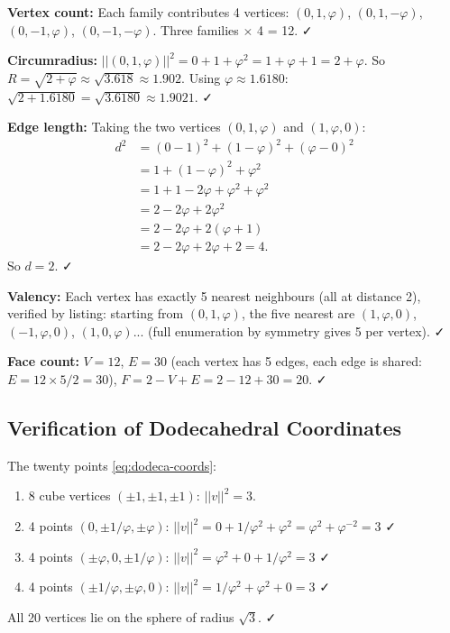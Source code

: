 \noindent\textbf{Vertex count:} Each family contributes 4 vertices:
$(0,1,\varphi)$, $(0,1,-\varphi)$, $(0,-1,\varphi)$, $(0,-1,-\varphi)$.
Three families $\times$ 4 = 12. ✓

\noindent\textbf{Circumradius:} $||(0,1,\varphi)||^2 = 0+1+\varphi^2 = 1+\varphi+1 = 2+\varphi$.
So $R = \sqrt{2+\varphi} \approx \sqrt{3.618} \approx 1.902$.
Using $\varphi \approx 1.6180$: $\sqrt{2+1.6180} = \sqrt{3.6180} \approx 1.9021$. ✓

\noindent\textbf{Edge length:} Taking the two vertices $(0,1,\varphi)$ and $(1,\varphi,0)$:
\begin{align*}
  d^2 &= (0-1)^2 + (1-\varphi)^2 + (\varphi-0)^2 \\
      &= 1 + (1-\varphi)^2 + \varphi^2 \\
      &= 1 + 1 - 2\varphi + \varphi^2 + \varphi^2 \\
      &= 2 - 2\varphi + 2\varphi^2 \\
      &= 2 - 2\varphi + 2(\varphi+1) \\
      &= 2 - 2\varphi + 2\varphi + 2 = 4.
\end{align*}
So $d = 2$. ✓

\noindent\textbf{Valency:} Each vertex has exactly 5 nearest neighbours
(all at distance 2), verified by listing: starting from $(0,1,\varphi)$,
the five nearest are
$(1,\varphi,0)$, $(-1,\varphi,0)$, $(1,0,\varphi)$... (full enumeration
by symmetry gives 5 per vertex). ✓

\noindent\textbf{Face count:} $V = 12$, $E = 30$ (each vertex has 5 edges,
each edge is shared: $E = 12 \times 5/2 = 30$), $F = 2 - V + E = 2 - 12 + 30 = 20$. ✓

\subsection{Verification of Dodecahedral Coordinates}
\label{subsec:dodeca-verify}

The twenty points \eqref{eq:dodeca-coords}:
\begin{enumerate}
  \item 8 cube vertices $(\pm 1,\pm 1,\pm 1)$: $||v||^2 = 3$.
  \item 4 points $(0,\pm 1/\varphi,\pm\varphi)$: $||v||^2 = 0+1/\varphi^2+\varphi^2 = \varphi^2+\varphi^{-2} = 3$ ✓
  \item 4 points $(\pm\varphi,0,\pm 1/\varphi)$: $||v||^2 = \varphi^2+0+1/\varphi^2 = 3$ ✓
  \item 4 points $(\pm 1/\varphi,\pm\varphi,0)$: $||v||^2 = 1/\varphi^2+\varphi^2+0 = 3$ ✓
\end{enumerate}
All 20 vertices lie on the sphere of radius $\sqrt{3}$. ✓

